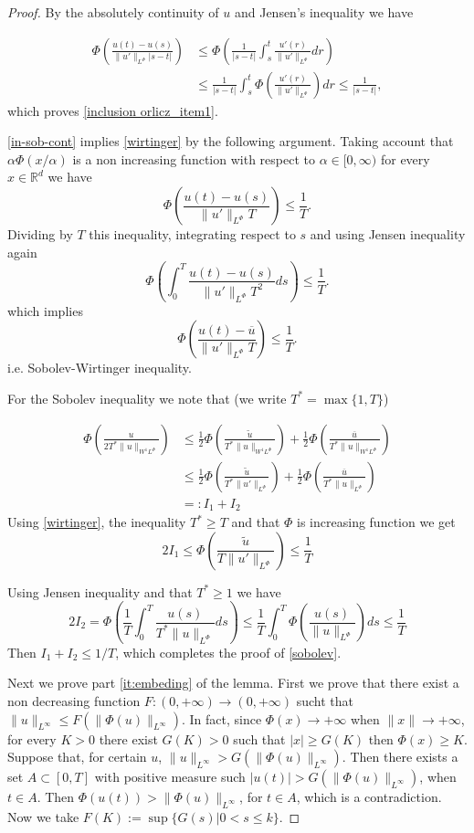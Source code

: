 \documentclass[twoside]{article}
\theoremstyle{remark}
\newcommand{\orlnor}{\|_{L^{\Phi}}}
\newcommand{\linf}{\|_{L^{\infty}}}
\newcommand{\lphi}{L^{\Phi}}
\newcommand{\sobnor}{\|_{W^{1}\lphi}}
\newcommand{\rr}{\mathbb{R}}
\renewcommand{\leq}{\leqslant}
\renewcommand{\geq}{\geqslant}
\begin{document}
\begin{proof} By the absolutely continuity of $u$ and Jensen's inequality we have

\[
 \begin{split}
    \Phi\left( \frac{u(t)-u(s)}{\|u'\orlnor |s-t|}\right) &\leq  \Phi\left( \frac{1}{ |s-t|}\int_s^t  \frac{u'(r)}{\|u'\orlnor }dr\right)\\
    &\leq   \frac{1}{ |s-t|}\int_s^t  \Phi\left(\frac{u'(r)}{\|u'\orlnor }\right)dr
    \leq \frac{1}{ |s-t|},
 \end{split}
\]
which proves  \ref{inclusion orlicz_item1}.

\ref{in-sob-cont}  implies \ref{wirtinger} by the following argument.  Taking account that $\alpha\Phi(x/\alpha)$ is a non increasing function with respect to $\alpha\in [0,\infty)$ for every $x\in\rr^d$ we have
\[\Phi\left( \frac{u(t)-u(s)}{\|u'\orlnor T}\right)\leq \frac{1}{T}.\]
Dividing by $T$ this inequality, integrating respect to $s$ and using Jensen inequality again
\[\Phi\left( \int_0^T \frac{u(t)-u(s)}{\|u'\orlnor T^2}ds \right)\leq \frac{1}{T}.\]
which implies
\[\Phi\left( \frac{u(t)-\overline{u}}{\|u'\orlnor T} \right)\leq \frac{1}{T}.\]
i.e. Sobolev-Wirtinger inequality.

For the Sobolev inequality we note that (we write $T^*=\max\{1,T\}$)

\[
 \begin{split}
  \Phi\left( \frac{u}{2T^*\|u\sobnor}\right) & \leq \frac{1}{2}\Phi\left( \frac{\tilde{u}}{T^*\|u\sobnor}\right) + \frac{1}{2}\Phi\left( \frac{\overline{u}}{T^*\|u\sobnor}\right)\\
  & \leq \frac{1}{2}\Phi\left( \frac{\tilde{u}}{T^*\|u'\orlnor}\right) + \frac{1}{2}\Phi\left( \frac{\overline{u}}{T^*\|u\orlnor}\right)\\
  &=: I_1+I_2
 \end{split}
\]
Using  \ref{wirtinger},  the inequality $T^*\geq T$ and that $\Phi$ is increasing function
we get
\[2I_1\leq\Phi\left( \frac{\tilde{u}}{T\|u'\orlnor}\right)\leq \frac{1}{T}
\]

Using Jensen inequality and that $T^*\geq 1$ we have
\[ 2I_2 = \Phi\left( \frac{1}{T}\int_0^T\frac{u(s)}{T^*\|u\orlnor}ds\right) \leq
\frac{1}{T}\int_0^T\Phi\left(\frac{u(s)}{\|u\orlnor}\right)ds\leq\frac{1}{T}
\]
Then $I_1+I_2\leq 1/T$, which completes the proof of \ref{sobolev}.

Next we prove part \ref{it:embeding} of the lemma. First we prove that there exist a non decreasing function $F:(0,+\infty)\to (0,+\infty)$ sucht that $\|u\linf\leq F(\|\Phi(u)\linf)$. In fact, since $\Phi(x)\to+\infty$ when $\|x\|\to+\infty$, for every $K>0$ there exist $G(K)>0$ such that $|x|\geq G(K)$ then $\Phi(x)\geq K$. Suppose that, for certain $u$,  $\|u\linf > G(\|\Phi(u)\linf)$. Then there exists a set $A\subset [0,T]$ with positive measure such $|u(t)| > G(\|\Phi(u)\linf)$, when $t\in A$. Then $\Phi(u(t))>\|\Phi(u)\linf$, for $t\in A$, which is a contradiction. Now we take $F(K):=\sup\{G(s)|0<s\leq k\}$. 





\end{proof}
\end{document}
